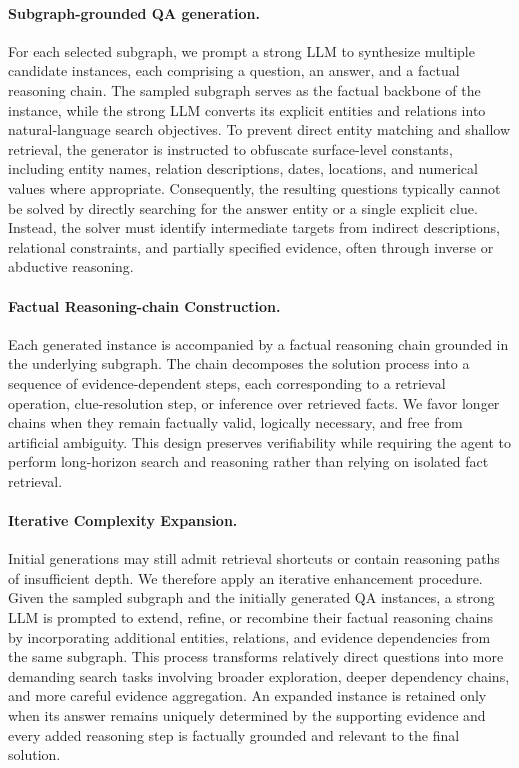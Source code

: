 \documentclass{huawei}
\begin{document}
\paragraph{Subgraph-grounded QA generation.} For each selected subgraph, we prompt a strong LLM to synthesize multiple candidate instances, each comprising a question, an answer, and a factual reasoning chain. The sampled subgraph serves as the factual backbone of the instance, while the strong LLM converts its explicit entities and relations into natural-language search objectives. To prevent direct entity matching and shallow retrieval, the generator is instructed to obfuscate surface-level constants, including entity names, relation descriptions, dates, locations, and numerical values where appropriate. Consequently, the resulting questions typically cannot be solved by directly searching for the answer entity or a single explicit clue. Instead, the solver must identify intermediate targets from indirect descriptions, relational constraints, and partially specified evidence, often through inverse or abductive reasoning.



\paragraph{Factual Reasoning-chain Construction.} Each generated instance is accompanied by a factual reasoning chain grounded in the underlying subgraph. The chain decomposes the solution process into a sequence of evidence-dependent steps, each corresponding to a retrieval operation, clue-resolution step, or inference over retrieved facts. We favor longer chains when they remain factually valid, logically necessary, and free from artificial ambiguity. This design preserves verifiability while requiring the agent to perform long-horizon search and reasoning rather than relying on isolated fact retrieval.



\paragraph{Iterative Complexity Expansion.} Initial generations may still admit retrieval shortcuts or contain reasoning paths of insufficient depth. We therefore apply an iterative enhancement procedure. Given the sampled subgraph and the initially generated QA instances, a strong LLM is prompted to extend, refine, or recombine their factual reasoning chains by incorporating additional entities, relations, and evidence dependencies from the same subgraph. This process transforms relatively direct questions into more demanding search tasks involving broader exploration, deeper dependency chains, and more careful evidence aggregation. An expanded instance is retained only when its answer remains uniquely determined by the supporting evidence and every added reasoning step is factually grounded and relevant to the final solution.
\end{document}
